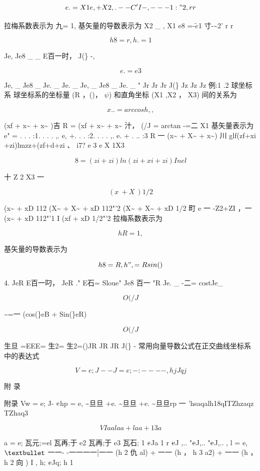 \[e. = X1 e, + X2 ,. - -C' I -,-- -1:" 2 , r r\]

拉梅系数表示为 九= 1, 基矢量的导数表示为 X2 \_ , X1 e8 =-$\tilde{e}$1 寸-\textasciitilde{}2' r r

\[h8 = r , h. = 1\]

Je, Je8 \_ \_ E百一时， J(\} -,

\[e. = e3\]

Je, \_ Je8 \_ Je. \_ Je. \_ Je, \_ Je8 \_ Je. \_ " Jr Jr Jr J(\} Jz Jz Jz 例:1 .2 球坐标系 球坐标系的坐标量 (R ，()， $\psi$) 和直角坐标 (X1 ,X2 ， X3) 间的关系为

\[x. .  =arccos h ,,\]

(xf + x\textasciitilde{} + x\textasciitilde{} )吉 R = (xf + x\textasciitilde{} + x\textasciitilde{} 汁， (/J = arctan -=二 X1 基矢量表示为 e" = . . . :1. . . . ,. e, +. . . :2. . . . ,. e. + . .. :3 R 一 (x\textasciitilde{} + X\textasciitilde{} + x\textasciitilde{}) 川 glf(zf+xi +zi)lmzz+(zf+d+zi 、 i7? e 3 e X 1X3

\[8=(zi+zi)ln(zi+xi +zi)In el\]

十 Z 2 X3 一

\[( x~ + X~) 1/2\]

(x\textasciitilde{} + xD 112 (X\textasciitilde{} + X\textasciitilde{} + xD 112"'2 (X\textasciitilde{} + X\textasciitilde{} + xD 1/2 町 e 一 -Z2+ZI ，一 (x\textasciitilde{} + xD 112"'1 I (xf + xD 1/2"'2 拉梅系数表示为

\[hR = 1,\]

基矢量的导数表示为

\[h8 = R , h", = Rsin()\]

4. JeR E百一叼， JeR ." E石= Sloue" Je8 百一 "R Je. \_ -二= costJe\_

\[O (/J\]

\textasciitilde{}=一 (cos(\}eB + Sin(\}eR)

\[O (/J\]

生旦 =EEE= 生2= 生2=()JR JR JR J(\} - 常用向量导数公式在正交曲线坐标系中的表达式

\[V = e; J- -J = e; -:- ---, hj Jqj\]

附 录

附录 Vw = e; J- ${\rm e}$hp = e, \textasciitilde{}旦旦 +e. \textasciitilde{}旦旦 +e. \textasciitilde{}旦旦rp 一 'hsaqalh18qITZhzaqz TZhaq3

\[VIaa l aa+laa+13a\]

a = e; 瓦元;=el 瓦再;于 e2 瓦再;于 e3 瓦石; 1 ${\rm e}$Ja 1 r ${\rm e}$J ,.. "${\rm e}$J,.. "${\rm e}$J,.. , l = e, ${\rm •}$ 一一- -一一一一|一一 (h 2 仇 al) + 一一 (h ， h 3 a2) + 一一 (h ， h 2 向 ) I , h; ${\rm e}$Jq; h 1

